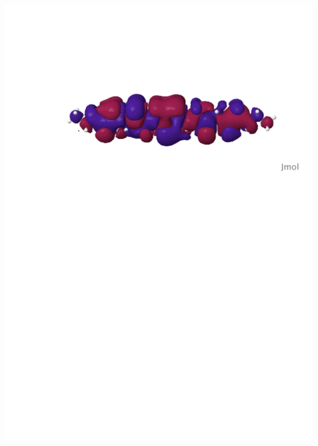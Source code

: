 \begin{frame}
\begin{columns}
\begin{column}[b]{0.48\linewidth}
\begin{center}
    \includegraphics[scale=0.3, clip, viewport = 80 560 600 700]
        {figures/can_orb_1.pdf}\\

\end{center}
\end{column}
\end{columns}
\end{frame}
